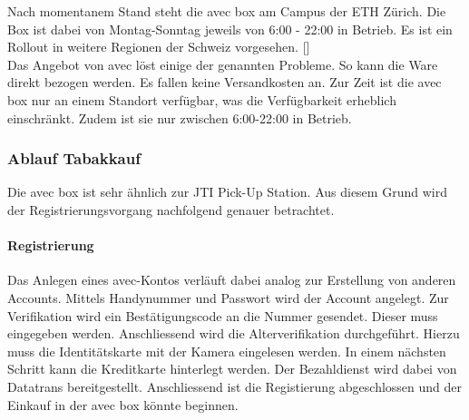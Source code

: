  Nach momentanem Stand steht die avec box am Campus der ETH Zürich. Die Box ist dabei von Montag-Sonntag jeweils von 6:00 - 22:00 in Betrieb. Es ist ein Rollout in weitere Regionen der Schweiz vorgesehen. [\cite{avecBoxStand}]\\
 Das Angebot von avec löst einige der genannten Probleme. So kann die Ware direkt bezogen werden. Es fallen keine Versandkosten an. Zur Zeit ist die avec box nur an einem Standort verfügbar, was die Verfügbarkeit erheblich einschränkt. Zudem ist sie nur zwischen 6:00-22:00 in Betrieb. 
 
 \subsubsection{Ablauf Tabakkauf}
Die avec box ist sehr ähnlich zur JTI Pick-Up Station. Aus diesem Grund wird der Registrierungsvorgang nachfolgend genauer betrachtet. 
\paragraph{Registrierung}
Das Anlegen eines avec-Kontos verläuft dabei analog zur Erstellung von anderen Accounts. Mittels Handynummer und Passwort wird der Account angelegt. Zur Verifikation wird ein Bestätigungscode an die Nummer gesendet. Dieser muss eingegeben werden. Anschliessend wird die Alterverifikation durchgeführt. Hierzu muss die Identitätskarte mit der Kamera eingelesen werden. In einem nächsten Schritt kann die Kreditkarte hinterlegt werden. Der Bezahldienst wird dabei von Datatrans bereitgestellt. Anschliessend ist die Registierung abgeschlossen und der Einkauf in der avec box könnte beginnen. \\

